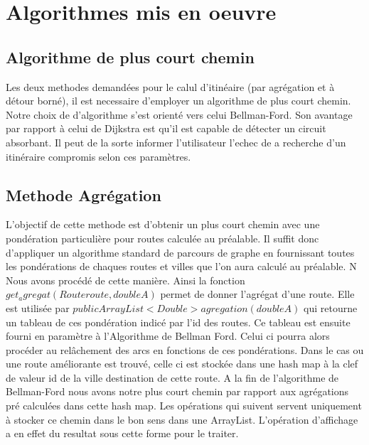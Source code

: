 \chapter{Algorithmes mis en oeuvre}


\section{Algorithme de plus court chemin}
Les deux methodes demandées pour le calul d'itinéaire (par agrégation et à détour borné), il est necessaire  d'employer un algorithme de plus court chemin. Notre choix de d'algorithme s'est orienté vers celui Bellman-Ford. Son avantage par rapport à celui de Dijkstra est qu'il est capable de détecter un circuit absorbant. Il peut de la sorte informer l'utilisateur l'echec de a recherche d'un itinéraire compromis selon ces paramètres. 



\section{Methode Agrégation}
L'objectif de cette methode est d'obtenir un plus court chemin avec une pondération particulière pour routes calculée au préalable.
Il suffit donc d'appliquer un algorithme standard de parcours de graphe en fournissant toutes les pondérations de chaques routes et villes que l'on aura calculé au préalable. N Nous avons procédé de cette manière. Ainsi la fonction $get_agregat(Route route, double A)$ permet de donner l'agrégat d'une route. Elle est utilisée par  $public ArrayList<Double> agregation(double A)$ qui retourne un tableau de ces pondération indicé par l'id des routes. Ce tableau est ensuite fourni en paramètre à l'Algorithme de Bellman Ford. Celui ci pourra alors procéder au relâchement des arcs en fonctions de ces pondérations. Dans le cas ou une route améliorante est trouvé, celle ci est stockée dans une hash map à la clef de valeur id de la ville destination de cette route. A la fin de l'algorithme de Bellman-Ford  nous avons notre plus court chemin par rapport aux agrégations pré calculées dans cette hash map. Les opérations qui suivent servent uniquement à stocker ce chemin dans le bon sens dans une ArrayList. L'opération d'affichage a en effet du resultat sous cette forme pour le traiter.

\clearpage
